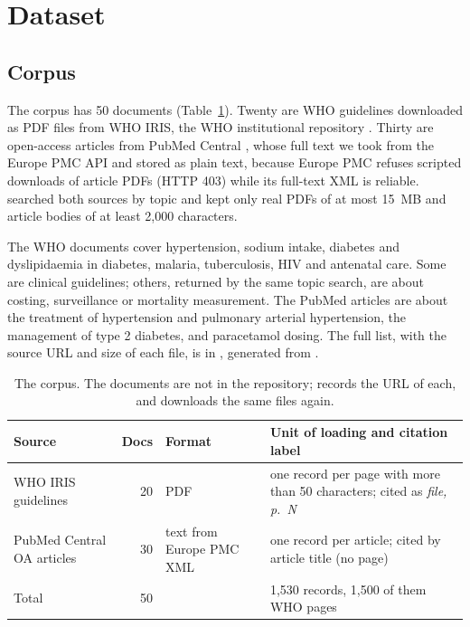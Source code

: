\section{Dataset}
\label{sec:dataset}

\subsection{Corpus}

The corpus has 50 documents (Table~\ref{tab:corpus}). Twenty are WHO guidelines downloaded as PDF files from WHO IRIS, the WHO institutional repository \citep{whoiris}. Thirty are open-access articles from PubMed Central \citep{pmcoa}, whose full text we took from the Europe PMC API \citep{europepmc2015} and stored as plain text, because Europe PMC refuses scripted downloads of article PDFs (HTTP 403) while its full-text XML is reliable.  searched both sources by topic and kept only real PDFs of at most 15~MB and article bodies of at least 2,000 characters.

The WHO documents cover hypertension, sodium intake, diabetes and dyslipidaemia in diabetes, malaria, tuberculosis, HIV and antenatal care. Some are clinical guidelines; others, returned by the same topic search, are about costing, surveillance or mortality measurement. The PubMed articles are about the treatment of hypertension and pulmonary arterial hypertension, the management of type 2 diabetes, and paracetamol dosing. The full list, with the source URL and size of each file, is in , generated from .

\begin{table}[htbp]
\centering
\caption{The corpus. The documents are not in the repository;  records the URL of each, and  downloads the same files again.}
\label{tab:corpus}
\small
\begin{tabularx}{\linewidth}{@{}lrlX@{}}
\toprule
Source & Docs & Format & Unit of loading and citation label \\
\midrule
WHO IRIS guidelines & 20 & PDF & one record per page with more than 50 characters; cited as \emph{file, p.~N} \\
PubMed Central OA articles & 30 & text from Europe PMC XML & one record per article; cited by article title (no page) \\
\midrule
Total & 50 & & 1,530 records, 1,500 of them WHO pages \\
\bottomrule
\end{tabularx}
\end{table}


